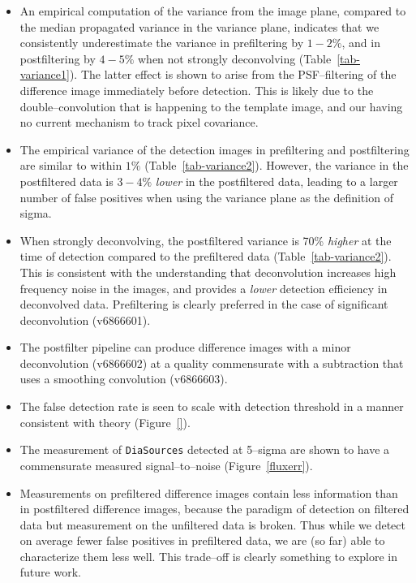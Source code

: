 \documentclass[prd, nofootinbib, floatfix, 11pt,tightenlines,times]{article}
\begin{document}
\begin{itemize}
\item An empirical computation of the variance from the image plane,
  compared to the median propagated variance in the variance plane,
  indicates that we consistently underestimate the variance in
  prefiltering by $1-2\%$, and in postfiltering by $4-5\%$ when not
  strongly deconvolving (Table~\ref{tab-variance1}).  The latter
  effect is shown to arise from the PSF--filtering of the difference
  image immediately before detection.  This is likely due to the
  double--convolution that is happening to the template image, and our
  having no current mechanism to track pixel covariance.

\item The empirical variance of the detection images in prefiltering
  and postfiltering are similar to within $1\%$
  (Table~\ref{tab-variance2}).  However, the variance in the
  postfiltered data is $3-4\%$ {\it lower} in the postfiltered data,
  leading to a larger number of false positives when using the
  variance plane as the definition of sigma.

\item When strongly deconvolving, the postfiltered variance is 70\%
  {\it higher} at the time of detection compared to the prefiltered
  data (Table~\ref{tab-variance2}).  This is consistent with the
  understanding that deconvolution increases high frequency noise in
  the images, and provides a {\it lower} detection efficiency in
  deconvolved data.  Prefiltering is clearly preferred in the case of
  significant deconvolution (v6866601).

\item The postfilter pipeline can produce difference images with a
  minor deconvolution (v6866602) at a quality commensurate with a subtraction that uses a
  smoothing convolution (v6866603).

\item The false detection rate is seen to scale with detection
  threshold in a manner consistent with theory (Figure~\ref{}).

\item The measurement of {\tt DiaSources} detected at 5--sigma are
  shown to have a commensurate measured signal--to--noise
  (Figure~\ref{fluxerr}).  

\item Measurements on prefiltered difference images contain less
  information than in postfiltered difference images, because the
  paradigm of detection on filtered data but measurement on the
  unfiltered data is broken.  Thus while we detect on average fewer
  false positives in prefiltered data, we are (so far) able to
  characterize them less well.  This trade--off is clearly something
  to explore in future work.


\end{itemize}
\end{document}
